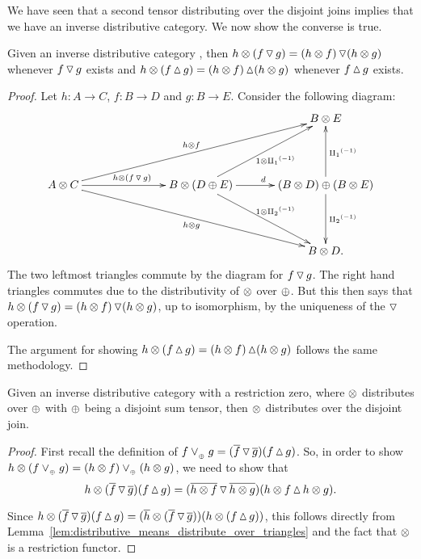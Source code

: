 We have seen that a second tensor distributing over the disjoint joins implies that we have an
inverse distributive category. We now show the converse is true.
\begin{lemma}\label{lem:distributive_means_distribute_over_triangles}
  Given an inverse distributive category \X, then $h\otimes(f\operatorname{\triangledown} g) = (h\otimes f) \operatorname{\triangledown} (h\otimes g)$
  whenever $f\operatorname{\triangledown} g$ exists and $h\otimes(f\operatorname{\vartriangle} g) = (h\otimes f) \operatorname{\vartriangle} (h\otimes g)$ whenever
  $f\operatorname{\vartriangle} g$ exists.
\end{lemma}
\begin{proof}
  Let $h:A \to C$, $f:B \to D$ and $g: B \to E$. Consider the following diagram:
  \[
    \xymatrix@R+20pt@C+10pt{
      & && B\*E\\
      A\*C \ar[rr]^{h\*(f\tjdown g)} \ar[drrr]_{h\*g} \ar[urrr]^{h\*f}
        && B \* (D \+ E) \ar[r]^{d} \ar[ur]_{1\*\icpa} \ar[dr]^{1\*\icpb}
        & (B\*D) \+ (B \* E) \ar[d]^{\icpb} \ar[u]_{\icpa}\\
      & && B\*D.
    }
  \]
  The two leftmost  triangles commute by the diagram for $f\operatorname{\triangledown} g$. The right hand triangles
  commutes due to the distributivity of $\otimes$ over $\oplus$. But this then says that
  $h\otimes(f\operatorname{\triangledown} g) = (h\otimes f)\operatorname{\triangledown}(h\otimes g)$, up to isomorphism, by the uniqueness of the
  $\operatorname{\triangledown}$ operation.

  The argument for showing $h\otimes(f\operatorname{\vartriangle} g) = (h\otimes f)\operatorname{\vartriangle}(h\otimes g)$ follows the same methodology.
\end{proof}
\begin{lemma}\label{lem:distributive_means_distribute_over_join}
  Given an inverse distributive category \X with a restriction zero, where $\otimes$ distributes over
  $\oplus$ with $\oplus$ being a disjoint sum tensor, then $\otimes$ distributes over the disjoint join.
\end{lemma}
\begin{proof}
  First recall the definition of $f\vee_{{_{\oplus}}} g = (\overline{f}\operatorname{\triangledown}\overline{g})(f\operatorname{\vartriangle} g)$. So, in order
  to show $h\otimes(f\vee_{{_{\oplus}}} g) = (h\otimes f)\vee_{{_{\oplus}}} (h\otimes g)$, we need to show that
  \begin{equation}
    h\otimes(\overline{f}\operatorname{\triangledown}\overline{g})(f\operatorname{\vartriangle} g) = (\overline{h\otimes f}\operatorname{\triangledown}\overline{h\otimes g})(h\otimes f\operatorname{\vartriangle} h\otimes g).
    \label{eq:distribute_over_left_right}
  \end{equation}

  Since $h\otimes(\overline{f}\operatorname{\triangledown}\overline{g})(f\operatorname{\vartriangle} g) =
  (\overline{h}\otimes(\overline{f}\operatorname{\triangledown}\overline{g}))(h\otimes(f\operatorname{\vartriangle} g))$, this follows directly from
  Lemma~\ref{lem:distributive_means_distribute_over_triangles} and the fact that $\otimes$ is a
  restriction functor.
\end{proof}

